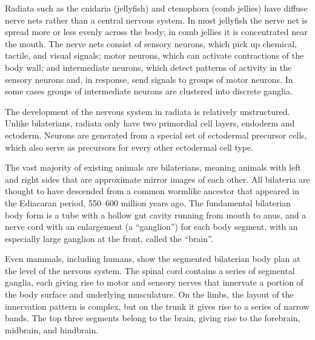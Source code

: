 Radiata such as the cnidaria (jellyfish) and ctenophora (comb jellies) have diffuse nerve nets rather than a central nervous system. In most jellyfish the nerve net is spread more or less evenly across the body; in comb jellies it is concentrated near the mouth. The nerve nets consist of sensory neurons, which pick up chemical, tactile, and visual signals; motor neurons, which can activate contractions of the body wall; and intermediate neurons, which detect patterns of activity in the sensory neurons and, in response, send signals to groups of motor neurons. In some cases groups of intermediate neurons are clustered into discrete ganglia.

The development of the nervous system in radiata is relatively unstructured. Unlike bilaterians, radiata only have two primordial cell layers, endoderm and ectoderm. Neurons are generated from a special set of ectodermal precursor cells, which also serve as precursors for every other ectodermal cell type.

The vast majority of existing animals are bilaterians, meaning animals with left and right sides that are approximate mirror images of each other. All bilateria are thought to have descended from a common wormlike ancestor that appeared in the Ediacaran period, 550--600 million years ago. The fundamental bilaterian body form is a tube with a hollow gut cavity running from mouth to anus, and a nerve cord with an enlargement (a ``ganglion'') for each body segment, with an especially large ganglion at the front, called the ``brain''.

Even mammals, including humans, show the segmented bilaterian body plan at the level of the nervous system. The spinal cord contains a series of segmental ganglia, each giving rise to motor and sensory nerves that innervate a portion of the body surface and underlying musculature. On the limbs, the layout of the innervation pattern is complex, but on the trunk it gives rise to a series of narrow bands. The top three segments belong to the brain, giving rise to the forebrain, midbrain, and hindbrain.

